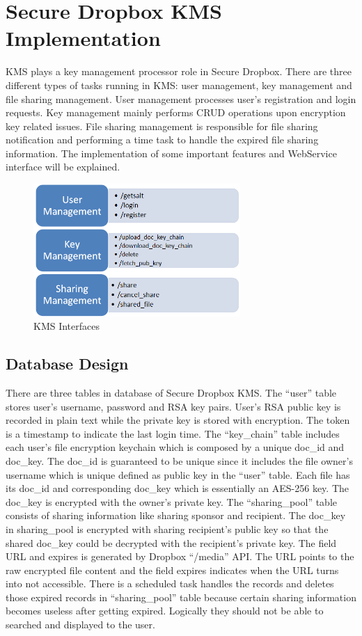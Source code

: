 \section{Secure Dropbox KMS Implementation}

KMS plays a key management processor role in Secure Dropbox. There are three different types of tasks running in KMS: user management, key management and file sharing management. User management processes user’s registration and login requests. Key management mainly performs CRUD operations upon encryption key related issues. File sharing management is responsible for file sharing notification and performing a time task to handle the expired file sharing information. The implementation of some important features and WebService interface will be explained.

\begin{figure}[h]
        \centering
        \includegraphics[width=0.7\textwidth]{figures/KMS_Interfaces.png}
        \caption[KMS Interfaces] {KMS Interfaces}
\end{figure}

\subsection{Database Design}

There are three tables in database of Secure Dropbox KMS. The ``user'' table stores user’s username, password and RSA key pairs. User’s RSA public key is recorded in plain text while the private key is stored with encryption. The token is a timestamp to indicate the last login time. The ``key\_chain'' table includes each user’s file encryption keychain which is composed by a unique doc\_id and doc\_key. The doc\_id is guaranteed to be unique since it includes the file owner’s username which is unique defined as public key in the “user” table. Each file has its doc\_id and corresponding doc\_key which is essentially an AES-256 key. The doc\_key is encrypted with the owner’s private key. The ``sharing\_pool'' table consists of sharing information like sharing sponsor and recipient. The doc\_key in sharing\_pool is encrypted with sharing recipient’s public key so that the shared doc\_key could be decrypted with the recipient’s private key. The field URL and expires is generated by Dropbox ``/media'' API. The URL points to the raw encrypted file content and the field expires indicates when the URL turns into not accessible. There is a scheduled task handles the records and deletes those expired records in ``sharing\_pool'' table because certain sharing information becomes useless after getting expired. Logically they should not be able to searched and displayed to the user.

